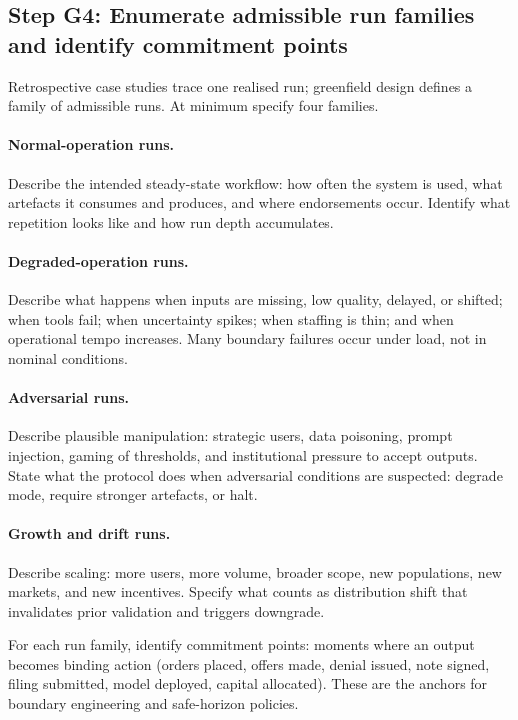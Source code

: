 \subsection{Step G4: Enumerate admissible run families and identify commitment points}

Retrospective case studies trace one realised run; greenfield design defines a family of admissible runs. At minimum specify four families.

\paragraph{Normal-operation runs.}
Describe the intended steady-state workflow: how often the system is used, what artefacts it consumes and produces, and where endorsements occur. Identify what repetition looks like and how run depth accumulates.

\paragraph{Degraded-operation runs.}
Describe what happens when inputs are missing, low quality, delayed, or shifted; when tools fail; when uncertainty spikes; when staffing is thin; and when operational tempo increases. Many boundary failures occur under load, not in nominal conditions.

\paragraph{Adversarial runs.}
Describe plausible manipulation: strategic users, data poisoning, prompt injection, gaming of thresholds, and institutional pressure to accept outputs. State what the protocol does when adversarial conditions are suspected: degrade mode, require stronger artefacts, or halt.

\paragraph{Growth and drift runs.}
Describe scaling: more users, more volume, broader scope, new populations, new markets, and new incentives. Specify what counts as distribution shift that invalidates prior validation and triggers downgrade.

For each run family, identify commitment points: moments where an output becomes binding action (orders placed, offers made, denial issued, note signed, filing submitted, model deployed, capital allocated). These are the anchors for boundary engineering and safe-horizon policies.

